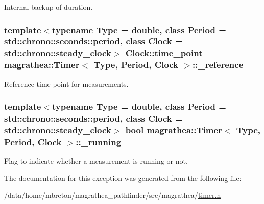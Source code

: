 Internal backup of duration. 

\hypertarget{exceptionmagrathea_1_1Timer_ad08277afa11789b6ea4cb88ed9f7c28b}{
\subsubsection[{\-\_\-reference}]{\setlength{\rightskip}{0pt plus 5cm}template$<$typename Type = double, class Period = std\-::chrono\-::seconds\-::period, class Clock = std\-::chrono\-::steady\-\_\-clock$>$ Clock\-::time\-\_\-point {\bf magrathea\-::\-Timer}$<$ Type, Period, Clock $>$\-::\-\_\-reference\hspace{0.3cm}{\ttfamily [protected]}}}\label{exceptionmagrathea_1_1Timer_ad08277afa11789b6ea4cb88ed9f7c28b}


Reference time point for measurements. 

\hypertarget{exceptionmagrathea_1_1Timer_a633b668aeba423f9d6229bce33267226}{
\subsubsection[{\-\_\-running}]{\setlength{\rightskip}{0pt plus 5cm}template$<$typename Type = double, class Period = std\-::chrono\-::seconds\-::period, class Clock = std\-::chrono\-::steady\-\_\-clock$>$ bool {\bf magrathea\-::\-Timer}$<$ Type, Period, Clock $>$\-::\-\_\-running\hspace{0.3cm}{\ttfamily [protected]}}}\label{exceptionmagrathea_1_1Timer_a633b668aeba423f9d6229bce33267226}


Flag to indicate whether a measurement is running or not. 



The documentation for this exception was generated from the following file\-:\begin{DoxyCompactItemize}
\item 
/data/home/mbreton/magrathea\-\_\-pathfinder/src/magrathea/\hyperlink{timer_8h}{timer.\-h}\end{DoxyCompactItemize}
